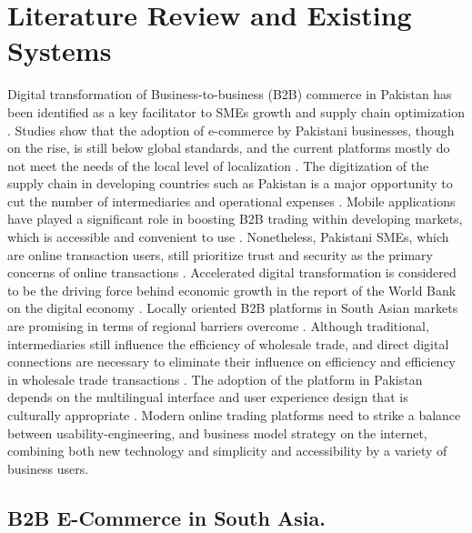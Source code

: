 \chapter{Literature Review and Existing Systems} \label{chap:literatureReview}

Digital transformation of Business-to-business (B2B) commerce in Pakistan has been identified as a key facilitator to SMEs growth and supply chain optimization \cite{han2023digital}. Studies show that the adoption of e-commerce by Pakistani businesses, though on the rise, is still below global standards, and the current platforms mostly do not meet the needs of the local level of localization \cite{ali2022ecommerce}. The digitization of the supply chain in developing countries such as Pakistan is a major opportunity to cut the number of intermediaries and operational expenses \cite{hussain2023supply}. Mobile applications have played a significant role in boosting B2B trading within developing markets, which is accessible and convenient to use \cite{farooq2024mobile}. Nonetheless, Pakistani SMEs, which are online transaction users, still prioritize trust and security as the primary concerns of online transactions \cite{zafar2022trust}. Accelerated digital transformation is considered to be the driving force behind economic growth in the report of the World Bank on the digital economy \cite{worldbank2023pakistan}. Locally oriented B2B platforms in South Asian markets are promising in terms of regional barriers overcome \cite{shaikh2024design}. Although traditional, intermediaries still influence the efficiency of wholesale trade, and direct digital connections are necessary to eliminate their influence on efficiency and efficiency in wholesale trade transactions \cite{raza2023impact}. The adoption of the platform in Pakistan depends on the multilingual interface and user experience design that is culturally appropriate \cite{akram2022user}. Modern online trading platforms need to strike a balance between usability-engineering, and business model strategy on the internet, combining both new technology and simplicity and accessibility by a variety of business users.

\section{B2B E-Commerce in South Asia.}

